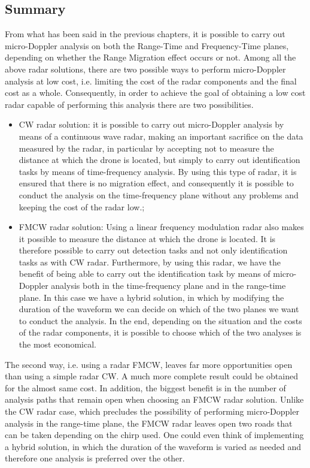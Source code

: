\subsection{Summary}
From what has been said in the previous chapters, it is possible to carry out micro-Doppler analysis on both the Range-Time and Frequency-Time planes, depending on whether the Range Migration effect occurs or not. 
Among all the above radar solutions, there are two possible ways to perform micro-Doppler analysis at low cost, i.e. limiting the cost of the radar components and the final cost as a whole.
Consequently, in order to achieve the goal of obtaining a low cost radar capable of performing this analysis there are two possibilities.
\begin{itemize}
    \item CW radar solution: it is possible to carry out micro-Doppler analysis by means of a continuous wave radar, making an important sacrifice on the data measured by the radar, in particular by accepting not to measure the distance at which the drone is located, but simply to carry out identification tasks by means of time-frequency analysis. By using this type of radar, it is ensured that there is no migration effect, and consequently it is possible to conduct the analysis on the time-frequency plane without any problems and keeping the cost of the radar low.;
    
    \item FMCW radar solution: Using a linear frequency modulation radar also makes it possible to measure the distance at which the drone is located. It is therefore possible to carry out detection tasks and not only identification tasks as with CW radar. Furthermore, by using this radar, we have the benefit of being able to carry out the identification task by means of micro-Doppler analysis both in the time-frequency plane and in the range-time plane. In this case we have a hybrid solution, in which by modifying the duration of the waveform we can decide on which of the two planes we want to conduct the analysis. In the end, depending on the situation and the costs of the radar components, it is possible to choose which of the two analyses is the most economical.


\end{itemize}
The second way, i.e. using a radar FMCW, leaves far more opportunities open than using a simple radar CW. A much more complete result could be obtained for the almost same cost. In addition, the biggest benefit is in the number of analysis paths that remain open when choosing an FMCW radar solution. Unlike the CW radar case, which precludes the possibility of performing micro-Doppler analysis in the range-time plane, the FMCW radar leaves open two roads that can be taken depending on the chirp used. One could even think of implementing a hybrid solution, in which the duration of the waveform is varied as needed and therefore one analysis is preferred over the other.\\
